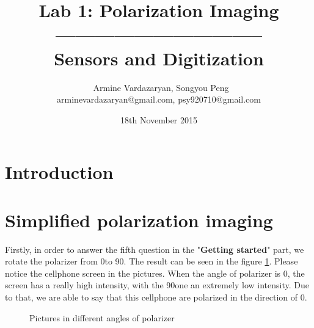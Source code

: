 \documentclass[english]{article}
\begin{document}
\title{Lab 1: Polarization Imaging\\ -------------------------------- \\ \Large Sensors and Digitization}
\author{ \ Armine Vardazaryan, Songyou Peng \\ arminevardazaryan@gmail.com, psy920710@gmail.com}
\date{18th November 2015}

\maketitle

\section{Introduction}

\section{Simplified polarization imaging}
Firstly, in order to answer the fifth question in the "\textbf{Getting started}" part, we rotate the polarizer from 0\textdegree to 90\textdegree. The result can be seen in the figure \ref{fig:one}. Please notice the cellphone screen in the pictures. When the angle of polarizer is 0\textdegree, the screen has a really high intensity, with the 90\textdegree one an extremely low intensity. Due to that, we are able to say that this cellphone are polarized in the direction of 0\textdegree.\\

\begin{figure}[H]
	\centering
	\caption{Pictures in different angles of polarizer}
	\label{fig:one}
\end{figure}
\end{document}
